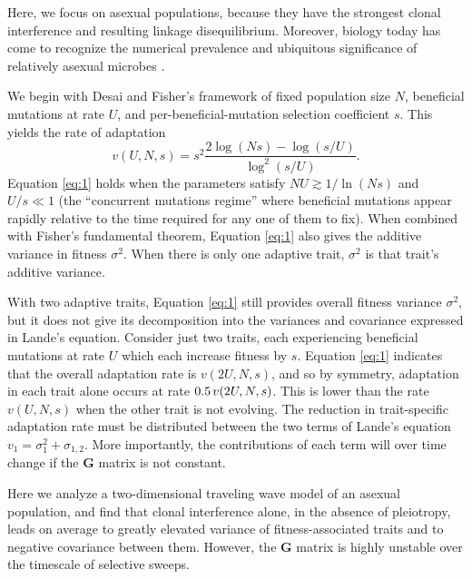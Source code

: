 \documentclass[9pt,twocolumn,twoside]{gsajnl}
\newcommand{\G}{\textbf{G }}
\begin{document}
Here, we focus on asexual populations, because they have the strongest clonal interference and resulting linkage disequilibrium. Moreover, biology today has come to recognize the numerical prevalence and ubiquitous significance of relatively asexual microbes \cite{mcfall2013animals}.\par

We begin with Desai and Fisher's \citep{desai2007beneficial} framework of fixed population size $N$, beneficial mutations at rate $U$, and per-beneficial-mutation selection coefficient $s$. This yields the rate of adaptation \citep[Equation 41]{desai2007beneficial}
\begin{equation}\label{eq:1}
v(U,N,s) = s^2\frac{2\log(N s)-\log(s/U)}{\log^2(s/U)}.
\end{equation}
Equation \ref{eq:1} holds when the parameters satisfy $NU \gtrsim 1/\ln(Ns)$ and $U/s \ll 1$ (the ``concurrent mutations regime''  where beneficial mutations appear rapidly relative to the time required for any one of them to fix). When combined with Fisher's fundamental theorem, Equation \eqref{eq:1} also gives the additive variance in fitness $\sigma^2$. When there is only one adaptive trait, $\sigma^2$ is that trait's additive variance. \par

With two adaptive traits, Equation \eqref{eq:1} still provides overall fitness variance $\sigma^2$, but it does not give its decomposition into the variances and covariance expressed in Lande's equation. Consider just two traits, each experiencing beneficial mutations at rate $U$ which each increase fitness by $s$. Equation \ref{eq:1} indicates that the overall adaptation rate is $v(2U,N,s)$, and so by symmetry, adaptation in each trait alone occurs at rate $0.5 \hspace{.02 in} v(2U,N,s)$. This is lower than the rate $v(U,N,s)$ when the other trait is not evolving. The reduction in trait-specific adaptation rate must be distributed between the two terms of Lande's equation $v_1 =\sigma_1^2 +\sigma_{1,2}$. More importantly, the contributions of each term will over time change if the \G matrix is not constant.\par

Here we analyze a two-dimensional traveling wave model of an asexual population, and find that clonal interference alone, in the absence of pleiotropy, leads on average to greatly elevated variance of fitness-associated traits and to negative covariance between them.  However, the \G matrix is highly unstable over the timescale of selective sweeps.
\end{document}
